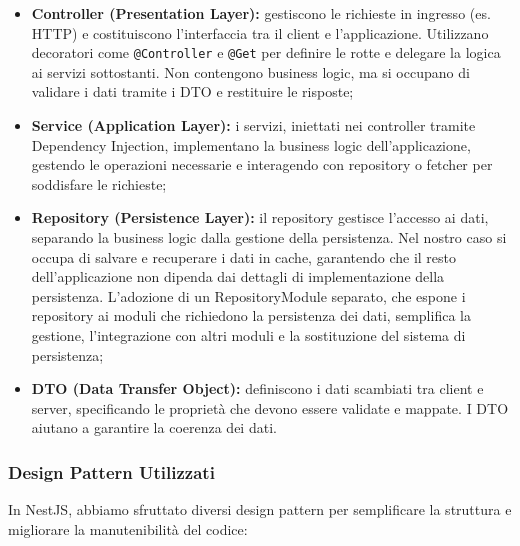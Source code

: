 \begin{itemize}  
  \item \textbf{Controller (Presentation Layer):} gestiscono le richieste in ingresso (es. HTTP) e costituiscono l'interfaccia tra il client e l'applicazione. Utilizzano decoratori come \texttt{@Controller} e \texttt{@Get} per definire le rotte e delegare la logica ai servizi sottostanti. Non contengono business logic, ma si occupano di validare i dati tramite i DTO e restituire le risposte;
  
  \item \textbf{Service (Application Layer):} i servizi, iniettati nei controller tramite Dependency Injection, implementano la business logic dell'applicazione, gestendo le operazioni necessarie e interagendo con repository o fetcher per soddisfare le richieste;
  
  \item \textbf{Repository (Persistence Layer):} il repository gestisce l'accesso ai dati, separando la business logic dalla gestione della persistenza. Nel nostro caso si occupa di salvare e recuperare i dati in cache, garantendo che il resto dell'applicazione non dipenda dai dettagli di implementazione della persistenza. L'adozione di un RepositoryModule separato, che espone i repository ai moduli che richiedono la persistenza dei dati, semplifica la gestione, l'integrazione con altri moduli e la sostituzione del sistema di persistenza;
  
  \item \textbf{DTO (Data Transfer Object):} definiscono i dati scambiati tra client e server, specificando le proprietà che devono essere validate e mappate. I DTO aiutano a garantire la coerenza dei dati.
\end{itemize}

\subsubsection{Design Pattern Utilizzati}

In NestJS, abbiamo sfruttato diversi design pattern per semplificare la struttura e migliorare la manutenibilità del codice:

